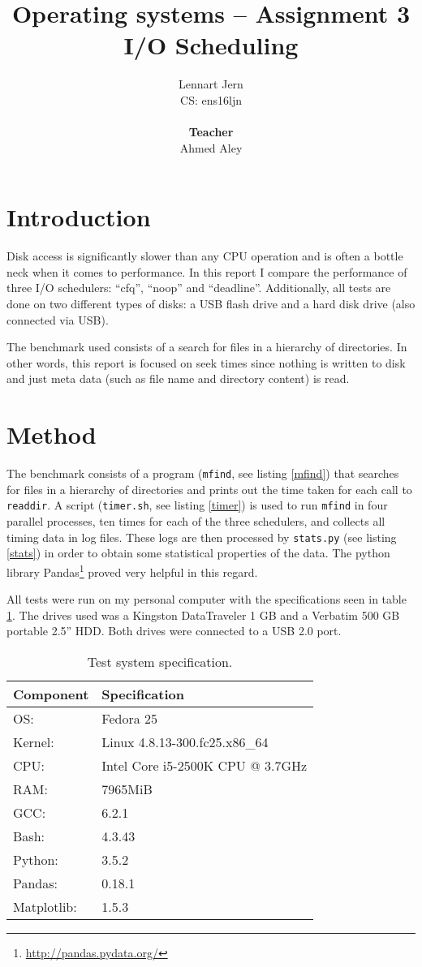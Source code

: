 \documentclass[12pt, a4paper]{article} %
\title{Operating systems -- Assignment 3\\I/O Scheduling}
\author{Lennart Jern\\
	CS: ens16ljn\\ \\ \textbf{Teacher}\\ Ahmed Aley}
\begin{document}
\maketitle

\newpage


\section{Introduction}

Disk access is significantly slower than any CPU operation and is often a bottle neck when it comes to performance.
In this report I compare the performance of three I/O schedulers: ``cfq'', ``noop'' and ``deadline''.
Additionally, all tests are done on two different types of disks: a USB flash drive and a hard disk drive (also connected via USB).

The benchmark used consists of a search for files in a hierarchy of directories.
In other words, this report is focused on seek times since nothing is written to disk and just meta data (such as file name and directory content) is read.

\section{Method}

The benchmark consists of a program (\texttt{mfind}, see listing \ref{mfind}) that searches for files in a hierarchy of directories and prints out the time taken for each call to \texttt{readdir}.
A script (\texttt{timer.sh}, see listing \ref{timer}) is used to run \texttt{mfind} in four parallel processes, ten times for each of the three schedulers, and collects all timing data in log files.
These logs are then processed by \texttt{stats.py} (see listing \ref{stats}) in order to obtain some statistical properties of the data.
The python library Pandas\footnote{\url{http://pandas.pydata.org/}} proved very helpful in this regard.


All tests were run on my personal computer with the specifications seen in table \ref{spec}.
The drives used was a Kingston DataTraveler 1 GB and a Verbatim 500 GB portable 2.5'' HDD.
Both drives were connected to a USB 2.0 port.

\begin{table}[h]
	\centering
	\begin{tabular}{ll}
		\toprule
		Component & Specification \\
		\midrule
		OS: & Fedora 25 \\
		Kernel: & Linux 4.8.13-300.fc25.x86\_64 \\
		CPU: & Intel Core i5-2500K CPU @ 3.7GHz \\
		RAM: & 7965MiB \\
		GCC: & 6.2.1 \\
		Bash: & 4.3.43 \\
		Python: & 3.5.2 \\
		Pandas: & 0.18.1 \\
		Matplotlib: & 1.5.3 \\
		\hline
	\end{tabular}
	\caption{Test system specification.}
	\label{spec}
\end{table}
\end{document}
